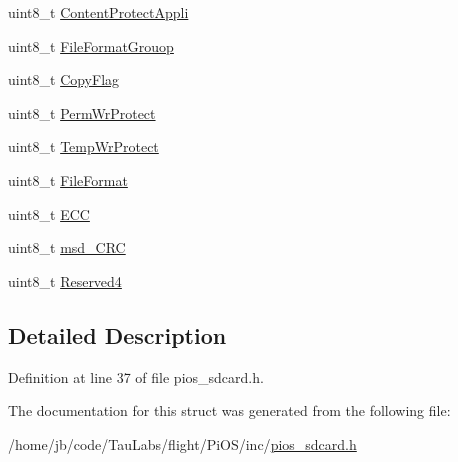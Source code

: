 \begin{DoxyCompactItemize}
uint8\-\_\-t \hyperlink{group___p_i_o_s___s_d_c_a_r_d_ga0ff4eb4714ed988bfe5d6418f553dee3}{\-Content\-Protect\-Appli}
\item 
uint8\-\_\-t \hyperlink{group___p_i_o_s___s_d_c_a_r_d_ga19785f76dae23ac16c7af85cc6c88460}{\-File\-Format\-Grouop}
\item 
uint8\-\_\-t \hyperlink{group___p_i_o_s___s_d_c_a_r_d_ga24efbbd2c557f214a8bfcec06ce30d19}{\-Copy\-Flag}
\item 
uint8\-\_\-t \hyperlink{group___p_i_o_s___s_d_c_a_r_d_ga191082389493442ce0b103f97282b952}{\-Perm\-Wr\-Protect}
\item 
uint8\-\_\-t \hyperlink{group___p_i_o_s___s_d_c_a_r_d_ga3a9535629b4573d3dbe39dabd51b341a}{\-Temp\-Wr\-Protect}
\item 
uint8\-\_\-t \hyperlink{group___p_i_o_s___s_d_c_a_r_d_gaf227b9cb873b11bbee9ce41d8bcaa3d1}{\-File\-Format}
\item 
uint8\-\_\-t \hyperlink{group___p_i_o_s___s_d_c_a_r_d_ga5e147c22c2995b291b7a5ea1a600c5a0}{\-E\-C\-C}
\item 
uint8\-\_\-t \hyperlink{group___p_i_o_s___s_d_c_a_r_d_ga653812c0595db0ef3eddae3dbf409b87}{msd\-\_\-\-C\-R\-C}
\item 
uint8\-\_\-t \hyperlink{group___p_i_o_s___s_d_c_a_r_d_ga2154190e5c6f32ce3b67bdc4a9aa3982}{\-Reserved4}
\end{DoxyCompactItemize}


\subsection{\-Detailed \-Description}


\-Definition at line 37 of file pios\-\_\-sdcard.\-h.



\-The documentation for this struct was generated from the following file\-:\begin{DoxyCompactItemize}
\item 
/home/jb/code/\-Tau\-Labs/flight/\-Pi\-O\-S/inc/\hyperlink{pios__sdcard_8h}{pios\-\_\-sdcard.\-h}\end{DoxyCompactItemize}

